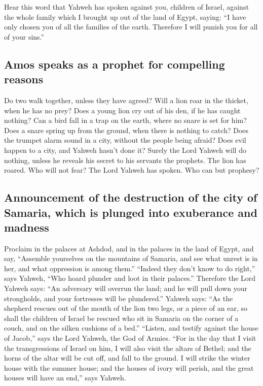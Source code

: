  Hear this word that Yahweh has spoken against you,
children of Israel, against the whole family which I brought up out of
the land of Egypt, saying:  ``I have only chosen you of
all the families of the earth. Therefore I will punish you for all of
your sins.''

\hypertarget{amos-speaks-as-a-prophet-for-compelling-reasons}{%
\subsection{Amos speaks as a prophet for compelling
reasons}\label{amos-speaks-as-a-prophet-for-compelling-reasons}}

 Do two walk together, unless they have agreed?
 Will a lion roar in the thicket, when he has no prey?
Does a young lion cry out of his den, if he has caught nothing?
 Can a bird fall in a trap on the earth, where no snare is
set for him? Does a snare spring up from the ground, when there is
nothing to catch?  Does the trumpet alarm sound in a city,
without the people being afraid? Does evil happen to a city, and Yahweh
hasn't done it?  Surely the Lord Yahweh will do nothing,
unless he reveals his secret to his servants the prophets.
 The lion has roared. Who will not fear? The Lord Yahweh
has spoken. Who can but prophesy?

\hypertarget{announcement-of-the-destruction-of-the-city-of-samaria-which-is-plunged-into-exuberance-and-madness}{%
\subsection{Announcement of the destruction of the city of Samaria,
which is plunged into exuberance and
madness}\label{announcement-of-the-destruction-of-the-city-of-samaria-which-is-plunged-into-exuberance-and-madness}}

 Proclaim in the palaces at Ashdod, and in the palaces in
the land of Egypt, and say, ``Assemble yourselves on the mountains of
Samaria, and see what unrest is in her, and what oppression is among
them.''  ``Indeed they don't know to do right,'' says
Yahweh, ``Who hoard plunder and loot in their palaces.'' 
Therefore the Lord Yahweh says: ``An adversary will overrun the land;
and he will pull down your strongholds, and your fortresses will be
plundered.''  Yahweh says: ``As the shepherd rescues out
of the mouth of the lion two legs, or a piece of an ear, so shall the
children of Israel be rescued who sit in Samaria on the corner of a
couch, and on the silken cushions of a bed.''  ``Listen,
and testify against the house of Jacob,'' says the Lord Yahweh, the God
of Armies.  ``For in the day that I visit the
transgressions of Israel on him, I will also visit the altars of Bethel;
and the horns of the altar will be cut off, and fall to the ground.
 I will strike the winter house with the summer house;
and the houses of ivory will perish, and the great houses will have an
end,'' says Yahweh.

